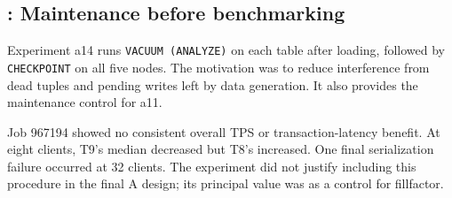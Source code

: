 \subsection{: Maintenance before benchmarking}
Experiment a14 runs \texttt{VACUUM (ANALYZE)} on each table after loading, followed by
\texttt{CHECKPOINT} on all five nodes. The motivation was to reduce interference
from dead tuples and pending writes left by data generation. It also provides
the maintenance control for a11.

Job 967194 showed no consistent overall TPS or transaction-latency benefit.
At eight clients, T9's median decreased but T8's increased. One final
serialization failure occurred at 32 clients. The experiment did not justify
including this procedure in the final A design; its principal value was as
a control for fillfactor.
